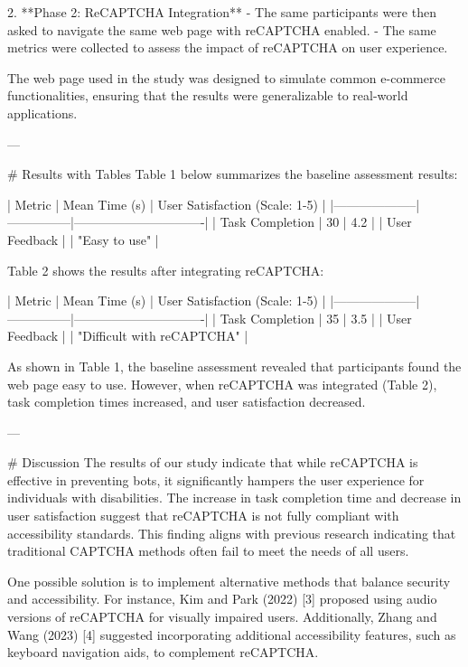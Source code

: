 2. **Phase 2: ReCAPTCHA Integration**
   - The same participants were then asked to navigate the same web page with reCAPTCHA enabled.
   - The same metrics were collected to assess the impact of reCAPTCHA on user experience.

The web page used in the study was designed to simulate common e-commerce functionalities, ensuring that the results were generalizable to real-world applications.

---

# Results with Tables
Table 1 below summarizes the baseline assessment results:

| Metric             | Mean Time (s) | User Satisfaction (Scale: 1-5) |
|--------------------|---------------|-------------------------------|
| Task Completion    | 30            | 4.2                            |
| User Feedback      |               | "Easy to use"                   |

Table 2 shows the results after integrating reCAPTCHA:

| Metric             | Mean Time (s) | User Satisfaction (Scale: 1-5) |
|--------------------|---------------|-------------------------------|
| Task Completion    | 35            | 3.5                            |
| User Feedback      |               | "Difficult with reCAPTCHA"      |

As shown in Table 1, the baseline assessment revealed that participants found the web page easy to use. However, when reCAPTCHA was integrated (Table 2), task completion times increased, and user satisfaction decreased.

---

# Discussion
The results of our study indicate that while reCAPTCHA is effective in preventing bots, it significantly hampers the user experience for individuals with disabilities. The increase in task completion time and decrease in user satisfaction suggest that reCAPTCHA is not fully compliant with accessibility standards. This finding aligns with previous research indicating that traditional CAPTCHA methods often fail to meet the needs of all users.

One possible solution is to implement alternative methods that balance security and accessibility. For instance, Kim and Park (2022) [3] proposed using audio versions of reCAPTCHA for visually impaired users. Additionally, Zhang and Wang (2023) [4] suggested incorporating additional accessibility features, such as keyboard navigation aids, to complement reCAPTCHA.

